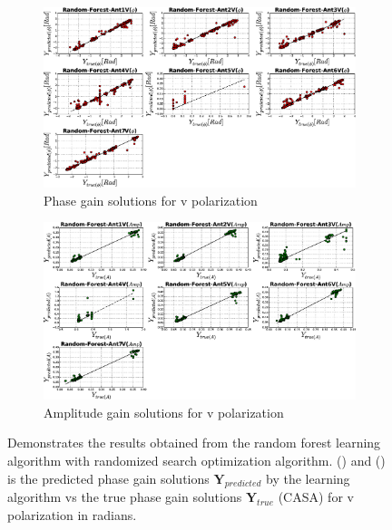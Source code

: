 \begin{figure}[H]
   \centering
    \begin{subfigure}[t]{0.52\textheight}
        
        \includegraphics[width=\textwidth]{images/Random-ForestVphase.eps} 
        \caption{Phase gain solutions for v polarization} \label{A3}
    \end{subfigure}
    
      \begin{subfigure}[t]{0.52\textheight}
       
        \includegraphics[width=\textwidth]{images/Random-ForestVamp.eps} 
        \caption{Amplitude gain solutions for v polarization} \label{B3}
    \end{subfigure}
    \caption{Demonstrates the results obtained from the random forest learning algorithm with randomized search optimization algorithm. () and () is the predicted phase gain solutions $\textbf{Y}_{predicted}$ by the learning algorithm vs the true phase gain solutions $\textbf{Y}_{true}$ (CASA) for v polarization in radians. }
    \end{figure} 
   
